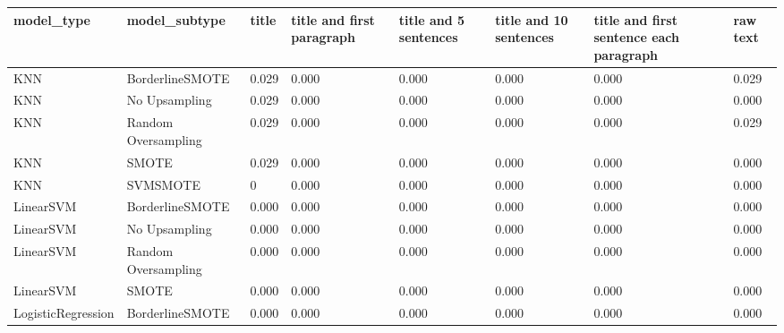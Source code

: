 \begin{tabular}{llllllll}
\toprule
                  model\_type &       model\_subtype & title & title and first paragraph & title and 5 sentences & title and 10 sentences & title and first sentence each paragraph &  raw text \\
\midrule
                         KNN &     BorderlineSMOTE & 0.029 &                     0.000 &                 0.000 &                  0.000 &                                   0.000 &     0.029 \\
                         KNN &       No Upsampling & 0.029 &                     0.000 &                 0.000 &                  0.000 &                                   0.000 &     0.000 \\
                         KNN & Random Oversampling & 0.029 &                     0.000 &                 0.000 &                  0.000 &                                   0.000 &     0.029 \\
                         KNN &               SMOTE & 0.029 &                     0.000 &                 0.000 &                  0.000 &                                   0.000 &     0.000 \\
                         KNN &            SVMSMOTE &     0 &                     0.000 &                 0.000 &                  0.000 &                                   0.000 &     0.000 \\
                   LinearSVM &     BorderlineSMOTE & 0.000 &                     0.000 &                 0.000 &                  0.000 &                                   0.000 &     0.000 \\
                   LinearSVM &       No Upsampling & 0.000 &                     0.000 &                 0.000 &                  0.000 &                                   0.000 &     0.000 \\
                   LinearSVM & Random Oversampling & 0.000 &                     0.000 &                 0.000 &                  0.000 &                                   0.000 &     0.000 \\
                   LinearSVM &               SMOTE & 0.000 &                     0.000 &                 0.000 &                  0.000 &                                   0.000 &     0.000 \\
          LogisticRegression &     BorderlineSMOTE & 0.000 &                     0.000 &                 0.000 &                  0.000 &                                   0.000 &     0.000 \\

\end{tabular}
